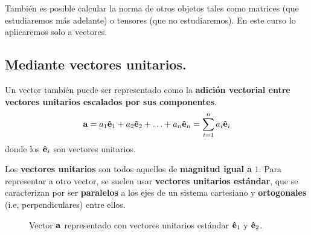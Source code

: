 \documentclass[12pt]{article}
\begin{document}
También es posible calcular la norma de otros objetos tales como matrices (que estudiaremos más adelante) o tensores (que no estudiaremos). En este curso lo aplicaremos solo a vectores.

\subsection{Mediante vectores unitarios.}

Un vector también puede ser representado como la \textbf{adición vectorial entre vectores unitarios escalados por sus componentes}.
\[
  \mathbf{a} = a_{1} \mathbf{\hat{e}}_{1} + a_{2} \mathbf{\hat{e}}_{2} + \ldots + a_{n} \mathbf{\hat{e}}_{n}
             = \sum_{i = 1}^{n} a_{i} \mathbf{\hat{e}}_{i}
\]
donde los $\mathbf{\hat{e}}_{i}$ son vectores unitarios.

Los \textbf{vectores unitarios} son todos aquellos de \textbf{magnitud igual a} $1$. Para representar a otro vector, se suelen usar \textbf{vectores unitarios estándar}, que se caracterizan por ser \textbf{paralelos} a los ejes de un sistema cartesiano y \textbf{ortogonales} (i.e, perpendiculares) entre ellos.

\begin{figure}[hbt!]
\centering


\caption{Vector $\mathbf{a}$ representado con vectores unitarios estándar $\mathbf{\hat{e}}_{1}$ y $\mathbf{\hat{e}}_{2}$.}

\end{figure}
\end{document}
